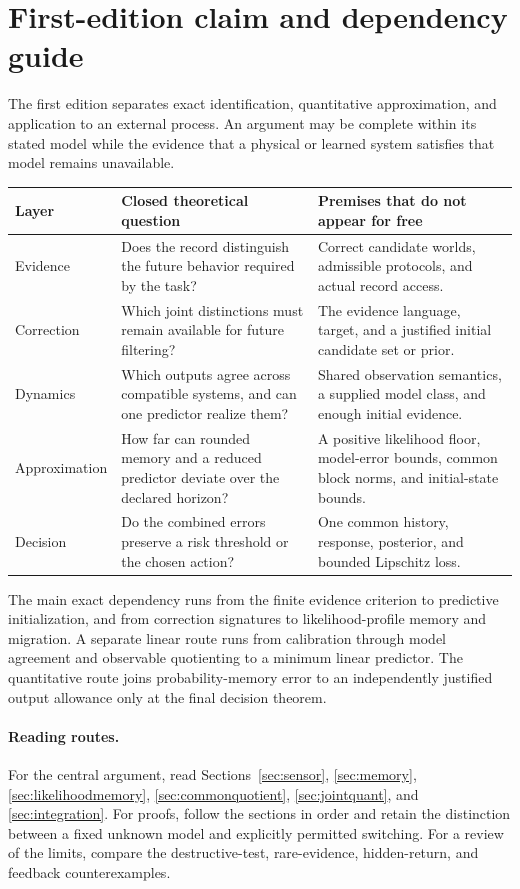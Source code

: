 \documentclass[11pt,letterpaper]{article}
\theoremstyle{plain}
\theoremstyle{definition}
\begin{document}
\section*{First-edition claim and dependency guide}
The first edition separates exact identification, quantitative approximation, and application to an external process. An argument may be complete within its stated model while the evidence that a physical or learned system satisfies that model remains unavailable.

\begin{center}\small
\begin{tabularx}{\textwidth}{@{}P{.18\textwidth}YY@{}}\toprule
Layer & Closed theoretical question & Premises that do not appear for free\\\midrule
Evidence & Does the record distinguish the future behavior required by the task? & Correct candidate worlds, admissible protocols, and actual record access.\\
Correction & Which joint distinctions must remain available for future filtering? & The evidence language, target, and a justified initial candidate set or prior.\\
Dynamics & Which outputs agree across compatible systems, and can one predictor realize them? & Shared observation semantics, a supplied model class, and enough initial evidence.\\
Approximation & How far can rounded memory and a reduced predictor deviate over the declared horizon? & A positive likelihood floor, model-error bounds, common block norms, and initial-state bounds.\\
Decision & Do the combined errors preserve a risk threshold or the chosen action? & One common history, response, posterior, and bounded Lipschitz loss.\\\bottomrule
\end{tabularx}
\end{center}

The main exact dependency runs from the finite evidence criterion to predictive initialization, and from correction signatures to likelihood-profile memory and migration. A separate linear route runs from calibration through model agreement and observable quotienting to a minimum linear predictor. The quantitative route joins probability-memory error to an independently justified output allowance only at the final decision theorem.

\paragraph{Reading routes.} For the central argument, read Sections~\ref{sec:sensor}, \ref{sec:memory}, \ref{sec:likelihoodmemory}, \ref{sec:commonquotient}, \ref{sec:jointquant}, and \ref{sec:integration}. For proofs, follow the sections in order and retain the distinction between a fixed unknown model and explicitly permitted switching. For a review of the limits, compare the destructive-test, rare-evidence, hidden-return, and feedback counterexamples.
\end{document}
